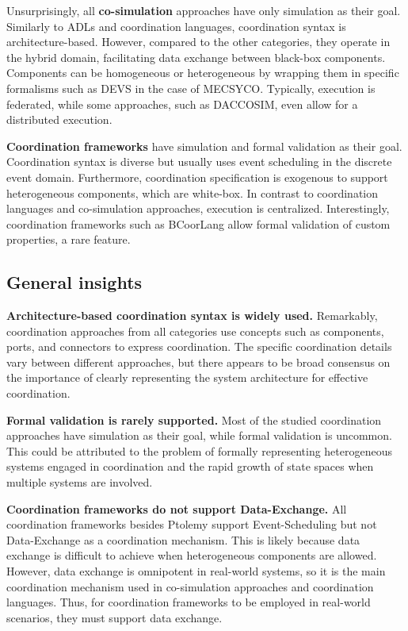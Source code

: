\documentclass[runningheads]{llncs}
\begin{document}
Unsurprisingly, all \textbf{co-simulation} approaches have only simulation as their goal.
Similarly to ADLs and coordination languages, coordination syntax is architecture-based.
However, compared to the other categories, they operate in the hybrid domain, facilitating data exchange between black-box components.
Components can be homogeneous or heterogeneous by wrapping them in specific formalisms such as DEVS in the case of MECSYCO.
Typically, execution is federated, while some approaches, such as DACCOSIM, even allow for a distributed execution.

\textbf{Coordination frameworks} have simulation and formal validation as their goal.
Coordination syntax is diverse but usually uses event scheduling in the discrete event domain.
Furthermore, coordination specification is exogenous to support heterogeneous components, which are white-box.
In contrast to coordination languages and co-simulation approaches, execution is centralized.
Interestingly, coordination frameworks such as BCoorLang allow formal validation of custom properties, a rare feature.

\subsection{General insights}

\textbf{Architecture-based coordination syntax is widely used.}
Remarkably, coordination approaches from all categories use concepts such as components, ports, and connectors to express coordination.
The specific coordination details vary between different approaches, but there appears to be broad consensus on the importance of clearly representing the system architecture for effective coordination.

\textbf{Formal validation is rarely supported.}
Most of the studied coordination approaches have simulation as their goal, while formal validation is uncommon.
This could be attributed to the problem of formally representing heterogeneous systems engaged in coordination and the rapid growth of state spaces when multiple systems are involved.

\textbf{Coordination frameworks do not support Data-Exchange.}
All coordination frameworks besides Ptolemy support \textsf{Event-Scheduling} but not \textsf{Data-Exchange} as a coordination mechanism.
This is likely because data exchange is difficult to achieve when heterogeneous components are allowed.
However, data exchange is omnipotent in real-world systems, so it is the main coordination mechanism used in co-simulation approaches and coordination languages.
Thus, for coordination frameworks to be employed in real-world scenarios, they must support data exchange.
\end{document}
